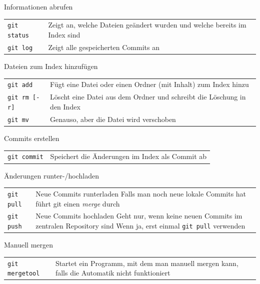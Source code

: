 \begin{frame}{Informationen abrufen}
  \begin{tabular}{lp{20em}}
    \texttt{git status} & Zeigt an, welche Dateien geändert wurden und welche bereits im Index sind \\
    \texttt{git log}    & Zeigt alle gespeicherten Commits an
  \end{tabular}
\end{frame}

\begin{frame}{Dateien zum Index hinzufügen}
  \begin{tabular}{lp{20em}}
    \texttt{git add} & Fügt eine Datei oder einen Ordner (mit Inhalt) zum Index hinzu \\
    \texttt{git rm [-r]}  & Löscht eine Datei aus dem Ordner und schreibt die Löschung in den Index  \\
    \texttt{git mv}  & Genauso, aber die Datei wird verschoben
  \end{tabular}
\end{frame}

\begin{frame}{Commits erstellen}
  \begin{tabular}{lp{20em}}
    \texttt{git commit} & Speichert die Änderungen im Index als Commit ab
  \end{tabular}
\end{frame}

\begin{frame}{Änderungen runter-/hochladen}
  \begin{tabular}{lp{20em}}
    \texttt{git pull} & Neue Commits runterladen \newline
                      Falls man noch neue lokale Commits hat führt git einen \textit{merge} durch \\
    \texttt{git push} & Neue Commits hochladen \newline
                      Geht nur, wenn keine neuen Commits im zentralen Repository sind \newline
                      Wenn ja, erst einmal \texttt{git pull} verwenden
  \end{tabular}
\end{frame}

\begin{frame}{Manuell mergen}
  \begin{tabular}{lp{20em}}
    \texttt{git mergetool} & Startet ein Programm, mit dem man manuell mergen kann, falls die Automatik nicht funktioniert
  \end{tabular}
\end{frame}
